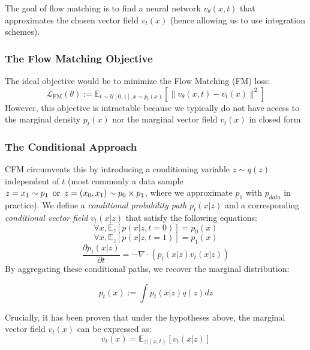 \documentclass[a4paper,11pt]{article}
\theoremstyle{plain}{\theorembodyfont{\rmfamily}%
\newtheorem{proposition}[theorem]{Proposition}}
\theoremstyle{plain}{\theorembodyfont{\rmfamily}%
\newtheorem{notation}[theorem]{Notation}}
\theoremstyle{plain}{\theorembodyfont{\rmfamily}%
\newtheorem{assumption}[theorem]{Assumption}}
\theoremstyle{plain}{\theorembodyfont{\rmfamily}%
\newtheorem{problem}[theorem]{Problem}}
\theoremstyle{plain}{\theorembodyfont{\rmfamily}%
\newtheorem{example}[theorem]{Example}}
\theoremstyle{plain}{\theorembodyfont{\rmfamily}%
\newtheorem{remark}[theorem]{Remark}}
\theoremstyle{plain}{\theorembodyfont{\rmfamily}%
\newtheorem{definition}[theorem]{Definition}}
\theoremstyle{plain}{\theorembodyfont{\rmfamily}%
\newtheorem{question}[theorem]{Question}}
\numberwithin{equation}{section}
\begin{document}
The goal of flow matching is to find a neural network $v_\theta(x, t)$ that approximates the chosen vector field $v_t(x)$ (hence allowing us to use integration schemes).

\subsubsection{The Flow Matching Objective}
The ideal objective would be to minimize the Flow Matching (FM) loss:
\begin{equation}
\mathcal{L}_{\text{FM}}(\theta) := \mathbb{E}_{t \sim \mathcal{U}[0, 1], x \sim p_t(x)} \left[ \| v_\theta(x, t) - v_t(x) \|^2 \right]
\end{equation}
However, this objective is intractable because we typically do not have access to the marginal density $p_t(x)$ nor the marginal vector field $v_t(x)$ in closed form.

\subsubsection{The Conditional Approach}
CFM circumvents this by introducing a conditioning variable $z \sim q(z)$ independent of $t$ (most commonly a data sample $z = x_1 \sim p_{1} \text{\, or \,} z = (x_0,x_1) \sim p_0 \times p_{1}$, where we approximate $p_1$ with $p_{data}$ in practice). We define a \textit{conditional probability path} $p_t(x|z)$ and a corresponding \textit{conditional vector field} $v_t(x|z)$ that satisfy the following equations:
\begin{equation}\label{init_0}
\forall x, \mathbb{E}_z[p(x|z,t=0)] = p_0(x)
\end{equation}
\begin{equation}\label{init_1}
\forall x, \mathbb{E}_z[p(x|z,t=1)] = p_1(x)
\end{equation}
\begin{equation}
\frac{\partial p_t(x|z)}{\partial t} = -\nabla \cdot (p_t(x|z) v_t(x|z))
\end{equation}
By aggregating these conditional paths, we recover the marginal distribution:

\begin{equation}
    p_t(x) := \int p_t(x|z) q(z) dz
\end{equation}

Crucially, it has been proven \cite{gagneux2025avisualdive} that under the hypotheses above, the marginal vector field $v_t(x)$ can be expressed as:
\begin{equation}
v_t(x) = \mathbb{E}_{z|(x,t)}[v_t(x|z)]
\end{equation}
\end{document}
